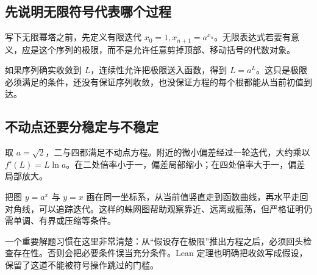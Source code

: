 \subsection*{先说明无限符号代表哪个过程}
写下无限幂塔之前，先定义有限迭代 $x_0=1,x_{n+1}=a^{x_n}$。无限表达式若要有意义，应是这个序列的极限，而不是允许任意剪掉顶部、移动括号的代数对象。

如果序列确实收敛到 $L$，连续性允许把极限送入函数，得到 $L=a^L$。这只是极限必须满足的条件，还没有保证序列收敛，也没保证方程的每个根都能从当前初值到达。

\subsection*{不动点还要分稳定与不稳定}
取 $a=\sqrt2$，二与四都满足不动点方程。附近的微小偏差经过一轮迭代，大约乘以 $f'(L)=L\ln a$。在二处倍率小于一，偏差局部缩小；在四处倍率大于一，偏差局部放大。

把图 $y=a^x$ 与 $y=x$ 画在同一坐标系，从当前值竖直走到函数曲线，再水平走回对角线，可以追踪迭代。这样的蛛网图帮助观察靠近、远离或振荡，但严格证明仍需单调、有界或压缩等条件。

一个重要解题习惯在这里非常清楚：从“假设存在极限”推出方程之后，必须回头检查存在性。否则会把必要条件误当充分条件。Lean 定理也明确把收敛写成假设，保留了这道不能被符号操作跳过的门槛。
